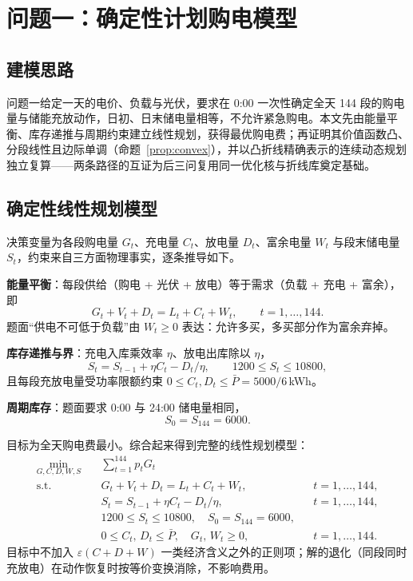 \section{问题一：确定性计划购电模型}
\subsection{建模思路}
问题一给定一天的电价、负载与光伏，要求在 0:00 一次性确定全天 144 段的购电量与储能充放动作，日初、日末储电量相等，不允许紧急购电。本文先由能量平衡、库存递推与周期约束建立线性规划，获得最优购电费；再证明其价值函数凸、分段线性且边际单调（命题~\ref{prop:convex}），并以凸折线精确表示的连续动态规划独立复算——两条路径的互证为后三问复用同一优化核与折线库奠定基础。

\subsection{确定性线性规划模型}
决策变量为各段购电量 $G_t$、充电量 $C_t$、放电量 $D_t$、富余电量 $W_t$ 与段末储电量 $S_t$，约束来自三方面物理事实，逐条推导如下。

\textbf{能量平衡}：每段供给（购电 + 光伏 + 放电）等于需求（负载 + 充电 + 富余），即
\begin{equation}
G_t+V_t+D_t=L_t+C_t+W_t,\qquad t=1,\dots,144.
\label{eq:q1balance}
\end{equation}
题面“供电不可低于负载”由 $W_t\ge0$ 表达：允许多买，多买部分作为富余弃掉。

\textbf{库存递推与界}：充电入库乘效率 $\eta$、放电出库除以 $\eta$，
\begin{equation}
S_t=S_{t-1}+\eta C_t-D_t/\eta,\qquad 1200\le S_t\le10800,
\label{eq:q1soc}
\end{equation}
且每段充放电量受功率限额约束 $0\le C_t,D_t\le\bar P=5000/6$\,kWh。

\textbf{周期库存}：题面要求 0:00 与 24:00 储电量相同，
\begin{equation}
S_0=S_{144}=6000.
\label{eq:q1periodic}
\end{equation}

目标为全天购电费最小。综合起来得到完整的线性规划模型：
\begin{equation}
\begin{aligned}
\min_{G,C,D,W,S}\quad & \sum_{t=1}^{144}p_tG_t\\
\mathrm{s.t.}\quad
& G_t+V_t+D_t=L_t+C_t+W_t, && t=1,\dots,144,\\
& S_t=S_{t-1}+\eta C_t-D_t/\eta, && t=1,\dots,144,\\
& 1200\le S_t\le 10800,\quad S_0=S_{144}=6000, && \\
& 0\le C_t,\,D_t\le\bar P,\quad G_t,\,W_t\ge 0, && t=1,\dots,144.
\end{aligned}
\label{eq:q1lp}
\end{equation}
目标中不加入 $\varepsilon(C+D+W)$ 一类经济含义之外的正则项；解的退化（同段同时充放电）在动作恢复时按等价变换消除，不影响费用。

